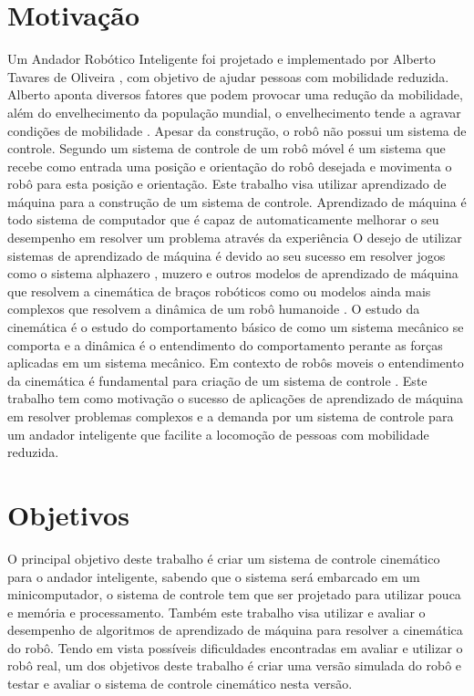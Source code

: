 \label{Cap:Introducao}

\section{Motivação}

Um Andador Robótico Inteligente foi projetado e implementado
por Alberto Tavares de Oliveira \cite{oliveira2022projeto},
com objetivo de ajudar pessoas com mobilidade reduzida. Alberto aponta
diversos fatores que podem provocar uma redução da mobilidade, além do 
envelhecimento da população mundial, o envelhecimento tende a agravar
condições de mobilidade . Apesar da construção,
o robô não possui um sistema de controle. Segundo \cite{siegwart2011introduction}
um sistema de controle de um robô móvel é um sistema que recebe
como entrada uma posição e orientação do robô desejada e movimenta o robô
para esta posição e orientação. Este trabalho visa utilizar
aprendizado de máquina para a construção de um sistema de controle.
Aprendizado de máquina é todo sistema de computador que é capaz de
automaticamente melhorar o seu desempenho em resolver um problema através
da experiência \cite{mitchell1990machine}
O desejo de utilizar sistemas de aprendizado de máquina é devido ao seu sucesso
em
resolver jogos como o sistema alphazero \cite{silver2017mastering}, muzero
\cite{schrittwieser2020mastering} e outros modelos de aprendizado de máquina
que resolvem a cinemática de braços robóticos como \cite{cavalcanti2017self}
ou modelos ainda mais complexos que resolvem a dinâmica de um robô humanoide
\cite{phaniteja2017deep}. O estudo da cinemática é o estudo do comportamento
básico de como um sistema mecânico se comporta e a dinâmica é o entendimento
do comportamento perante as forças aplicadas em um sistema mecânico. Em contexto
de robôs moveis o entendimento da cinemática é fundamental para criação de um
sistema de controle \cite{siegwart2011introduction}. Este trabalho tem como
motivação o sucesso de aplicações de aprendizado de máquina em resolver problemas
complexos e a demanda por um sistema de controle para um andador
inteligente que facilite a locomoção de pessoas com mobilidade reduzida. 

\section{Objetivos}

O principal objetivo deste trabalho é criar um  sistema de
controle cinemático para o andador inteligente, sabendo que o sistema será
embarcado em um minicomputador, o sistema de controle tem que ser
projetado para utilizar pouca e memória e processamento.
Também este trabalho visa utilizar e avaliar o desempenho de algoritmos
de aprendizado de máquina para resolver a cinemática do robô. Tendo em
vista possíveis dificuldades encontradas em avaliar e utilizar o robô real,
um dos objetivos deste trabalho é criar uma versão simulada do robô e
testar e avaliar o sistema de controle cinemático nesta versão.

